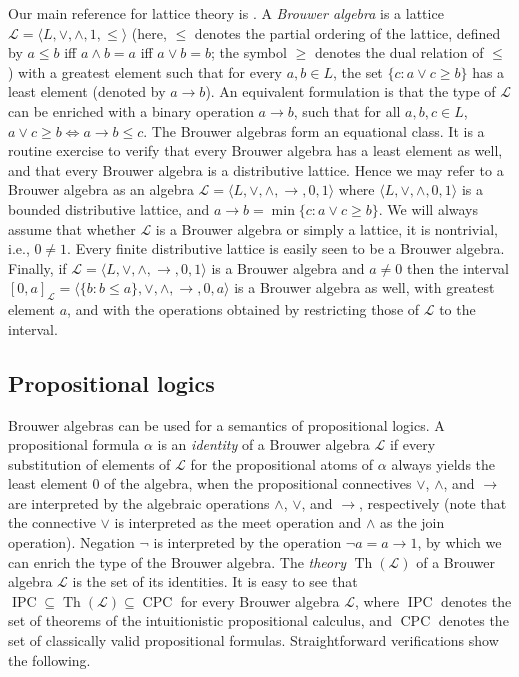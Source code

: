 \documentclass[11pt]{amsart}
\newcommand{\Th}{\operatorname{Th}}
\newcommand{\IPC}{\operatorname{IPC}}
\newcommand{\CPC}{\operatorname{CPC}}
\newcommand{\MP}[1]{\ensuremath{\mathcal{#1}}}
\begin{document}
Our main reference for lattice theory is \cite{BalbesDwinger}. A 
\emph{Brouwer algebra} is a lattice $\mathscr{L}=\langle L, \lor, \wedge, 1, 
\leq \rangle$ (here, $\leq$ denotes the partial ordering of the lattice, 
defined by $a\leq b$ iff $a\wedge b=a$ iff $a\lor b=b$; the symbol $\geq$ 
denotes the dual relation of $\leq$) with a greatest element such that for 
every $a,b \in L$, the set $\{c: a \lor c \geq b\}$ has a least element 
(denoted by $a \rightarrow b$). An equivalent formulation is that the type of 
$\mathscr{L}$ can be enriched with a binary operation $a \rightarrow b$, such 
that for all  $a,b,c \in L$, $a \lor c \geq b \Leftrightarrow a\rightarrow b 
\le c$. The Brouwer algebras form an equational class. It is a routine 
exercise to verify that every Brouwer algebra has a least element as well, 
and that every Brouwer algebra is a distributive lattice. Hence we may refer 
to a Brouwer algebra as an algebra $\mathscr{L}=\langle L, \lor, \wedge, 
\rightarrow, 0, 1\rangle$ where $\langle L, \lor, \wedge,  0, 1\rangle$ is a 
bounded distributive lattice, and $a\rightarrow b=\min \{c: a \lor c \geq 
b\}$. We will always assume that whether $\mathscr{L}$ is a Brouwer algebra 
or simply a lattice, it is nontrivial, i.e., $0\ne 1$. Every finite 
distributive lattice is easily seen to be a Brouwer algebra. Finally, if 
$\mathscr{L}=\langle L, \lor, \wedge, \rightarrow, 0, 1\rangle$ is a Brouwer 
algebra and $a\ne 0$ then the interval $[0,a]_{\mathscr{L}}= \langle \{b: b 
\leq a\}, \lor, \wedge, \rightarrow, 0, a\rangle$ is a Brouwer algebra as 
well, with greatest element $a$, and with the operations obtained by 
restricting those of $\mathscr{L}$ to the interval. 
 
\subsection{Propositional logics} 

Brouwer algebras can be used for a semantics of propositional logics. A 
propositional formula $\alpha$ is an \emph{identity} of a Brouwer algebra 
$\mathscr{L}$ if every substitution of elements of $\mathscr{L}$ for the 
propositional atoms of $\alpha$ always yields the least element $0$ of the 
algebra, when the propositional connectives $\lor$, $\wedge$, and 
$\rightarrow$ are interpreted by the algebraic operations $\wedge$, $\lor$, 
and $\rightarrow$, respectively (note that the connective $\lor$ is 
interpreted as the meet operation and $\wedge$ as the join operation). 
Negation $\neg$ is interpreted by the operation $\neg a = a \rightarrow 1$, 
by which we can enrich the type of the Brouwer algebra. The \emph{theory} 
$\Th(\mathscr{L})$ of a Brouwer algebra $\mathscr{L}$ is the set of its 
identities. It is easy to see that $\IPC \subseteq \Th(\mathscr{L}) \subseteq 
\CPC$ for every Brouwer algebra $\MP{L}$, where $\IPC$ denotes the set of 
theorems of the intuitionistic propositional calculus, and $\CPC$ denotes the 
set of classically valid propositional formulas. Straightforward 
verifications show the following. 
\end{document}
